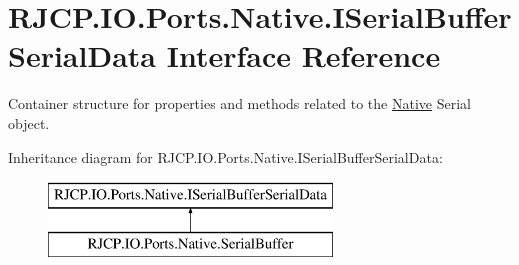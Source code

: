 \hypertarget{interface_r_j_c_p_1_1_i_o_1_1_ports_1_1_native_1_1_i_serial_buffer_serial_data}{}\section{R\+J\+C\+P.\+I\+O.\+Ports.\+Native.\+I\+Serial\+Buffer\+Serial\+Data Interface Reference}
\label{interface_r_j_c_p_1_1_i_o_1_1_ports_1_1_native_1_1_i_serial_buffer_serial_data}


Container structure for properties and methods related to the \mbox{\hyperlink{namespace_r_j_c_p_1_1_i_o_1_1_ports_1_1_native}{Native}} Serial object.  


Inheritance diagram for R\+J\+C\+P.\+I\+O.\+Ports.\+Native.\+I\+Serial\+Buffer\+Serial\+Data\+:\begin{figure}[H]
\begin{center}
\leavevmode
\includegraphics[height=2.000000cm]{interface_r_j_c_p_1_1_i_o_1_1_ports_1_1_native_1_1_i_serial_buffer_serial_data}
\end{center}
\end{figure}
